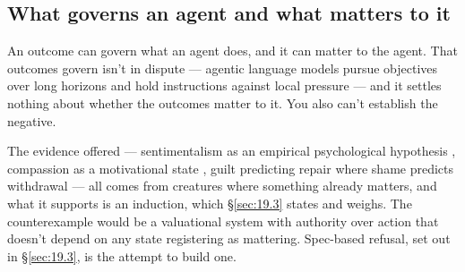 \subsection{What governs an agent and what matters to it}
\label{sec:21.2.2}
An outcome can govern what an agent does, and it can matter to the agent. That outcomes govern isn't in dispute — agentic language models pursue objectives over long horizons and hold instructions against local pressure — and it settles nothing about whether the outcomes matter to it. You also can't establish the negative.

The evidence offered — sentimentalism as an empirical psychological hypothesis \autocite{nichols2004sentimental}, compassion as a motivational state \autocite{goetz2010compassion}, guilt predicting repair where shame predicts withdrawal \autocite{tangney2007moral} — all comes from creatures where something already matters, and what it supports is an induction, which \S\ref{sec:19.3} states and weighs. The counterexample would be a valuational system with authority over action that doesn't depend on any state registering as mattering. Spec-based refusal, set out in \S\ref{sec:19.3}, is the attempt to build one.
